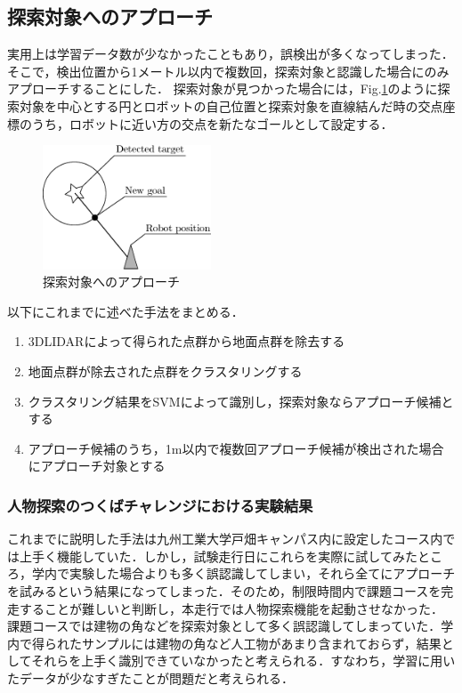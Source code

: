 \documentclass[10pt,a4paper]{jarticle}
\begin{document}
\subsection{探索対象へのアプローチ}
実用上は学習データ数が少なかったこともあり，誤検出が多くなってしまった．そこで，検出位置から1メートル以内で複数回，探索対象と認識した場合にのみアプローチすることにした．
探索対象が見つかった場合には，Fig.\ref{142629_6Dec16}のように探索対象を中心とする円とロボットの自己位置と探索対象を直線結んだ時の交点座標のうち，ロボットに近い方の交点を新たなゴールとして設定する．

\begin{figure}[ht]
 \centering
 \includegraphics[width=5cm]{./fig/eps/approach_to_target.eps}
 \caption{探索対象へのアプローチ}
 \label{142629_6Dec16}
\end{figure}

以下にこれまでに述べた手法をまとめる．
\begin{enumerate}
 \item 3DLIDARによって得られた点群から地面点群を除去する
 \item 地面点群が除去された点群をクラスタリングする
 \item クラスタリング結果をSVMによって識別し，探索対象ならアプローチ候補とする
 \item アプローチ候補のうち，1m以内で複数回アプローチ候補が検出された場合にアプローチ対象とする
\end{enumerate}

\subsubsection{人物探索のつくばチャレンジにおける実験結果}
これまでに説明した手法は九州工業大学戸畑キャンパス内に設定したコース内では上手く機能していた．しかし，試験走行日にこれらを実際に試してみたところ，学内で実験した場合よりも多く誤認識してしまい，それら全てにアプローチを試みるという結果になってしまった．そのため，制限時間内で課題コースを完走することが難しいと判断し，本走行では人物探索機能を起動させなかった．
課題コースでは建物の角などを探索対象として多く誤認識してしまっていた．学内で得られたサンプルには建物の角など人工物があまり含まれておらず，結果としてそれらを上手く識別できていなかったと考えられる．すなわち，学習に用いたデータが少なすぎたことが問題だと考えられる．
\end{document}

